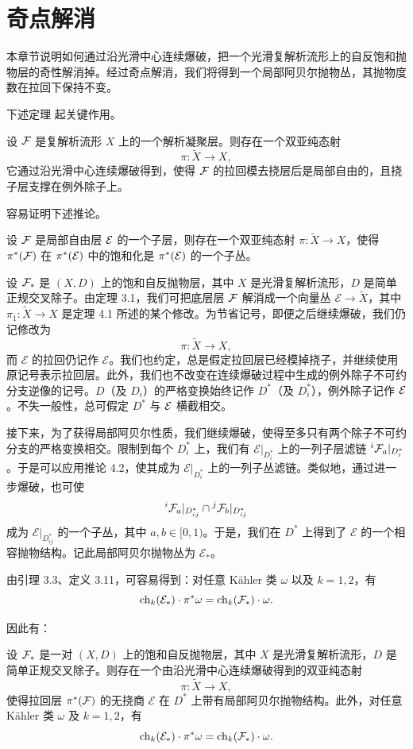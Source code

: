 \chapter{奇点解消}

本章节说明如何通过沿光滑中心连续爆破，把一个光滑复解析流形上的自反饱和抛物层的奇性解消掉。经过奇点解消，我们将得到一个局部阿贝尔抛物丛，其抛物度数在拉回下保持不变。

下述定理 \cite[Theorem 4.11]{grivaux2010chern} 起关键作用。

\begin{theorem}
设 \(\mathcal{F}\) 是复解析流形 \(X\) 上的一个解析凝聚层。则存在一个双亚纯态射
\[
\pi:\widetilde X\to X,
\]
它通过沿光滑中心连续爆破得到，使得 \(\mathcal{F}\) 的拉回模去挠层后是局部自由的，且挠子层支撑在例外除子上。
\end{theorem}

容易证明下述推论。

\begin{corollary}
设 \(\mathcal{F}\) 是局部自由层 \(\mathcal{E}\) 的一个子层，则存在一个双亚纯态射 \(\pi:\widetilde X\to X\)，使得 \(\pi^*(\mathcal{F})\) 在 \(\pi^*(\mathcal{E})\) 中的饱和化是 \(\pi^*(\mathcal{E})\) 的一个子丛。
\end{corollary}

设 \(\mathcal{F}_*\) 是 \((X,D)\) 上的饱和自反抛物层，其中 \(X\) 是光滑复解析流形，\(D\) 是简单正规交叉除子。由定理 3.1，我们可把底层层 \(\mathcal{F}\) 解消成一个向量丛 \(\mathcal E\to \widetilde X\)，其中 \(\pi_1:\widetilde X\to X\) 是定理 4.1 所述的某个修改。为节省记号，即便之后继续爆破，我们仍记修改为
\[
\pi:\widetilde X\to X,
\]
而 \(\mathcal E\) 的拉回仍记作 \(\mathcal E\)。我们也约定，总是假定拉回层已经模掉挠子，并继续使用原记号表示拉回层。此外，我们也不改变在连续爆破过程中生成的例外除子不可约分支逆像的记号。\(D\)（及 \(D_i\)）的严格变换始终记作 \(D^*\)（及 \(D_i^*\)），例外除子记作 \(\mathcal{E}\)。不失一般性，总可假定 \(D^*\) 与 \(\mathcal{E}\) 横截相交。

接下来，为了获得局部阿贝尔性质，我们继续爆破，使得至多只有两个除子不可约分支的严格变换相交。限制到每个 \(D_i^*\) 上，我们有 \(\mathcal E|_{D_i^*}\) 上的一列子层滤链 \({}^i\mathcal{F}_a|_{D_i^*}\)。于是可以应用推论 4.2，使其成为 \(\mathcal E|_{D_i^*}\) 上的一列子丛滤链。类似地，通过进一步爆破，也可使
\[
{}^i\mathcal{F}_a|_{D_{ij}^*}\cap {}^j\mathcal{F}_b|_{D_{ij}^*}
\]
成为 \(\mathcal E|_{D_{ij}^*}\) 的一个子丛，其中 \(a,b\in[0,1)\)。于是，我们在 \(D^*\) 上得到了 \(\mathcal E\) 的一个相容抛物结构。记此局部阿贝尔抛物丛为 \(\mathcal E_*\)。

由引理 3.3、定义 3.11，可容易得到：对任意 Kähler 类 \(\omega\) 以及 \(k=1,2\)，有
\[
\operatorname{ch}_k(\mathcal E_*)\cdot \pi^*\omega=\operatorname{ch}_k(\mathcal{F}_*)\cdot \omega.
\]

因此有：

\begin{proposition}
设 \(\mathcal{F}_*\) 是一对 \((X,D)\) 上的饱和自反抛物层，其中 \(X\) 是光滑复解析流形，\(D\) 是简单正规交叉除子。则存在一个由沿光滑中心连续爆破得到的双亚纯态射
\[
\pi:\widetilde X\to X,
\]
使得拉回层 \(\pi^*(\mathcal{F})\) 的无挠商 \(\mathcal E\) 在 \(D^*\) 上带有局部阿贝尔抛物结构。此外，对任意 Kähler 类 \(\omega\) 及 \(k=1,2\)，有
\[
\operatorname{ch}_k(\mathcal E_*)\cdot \pi^*\omega=\operatorname{ch}_k(\mathcal{F}_*)\cdot \omega.
\]
\end{proposition}
